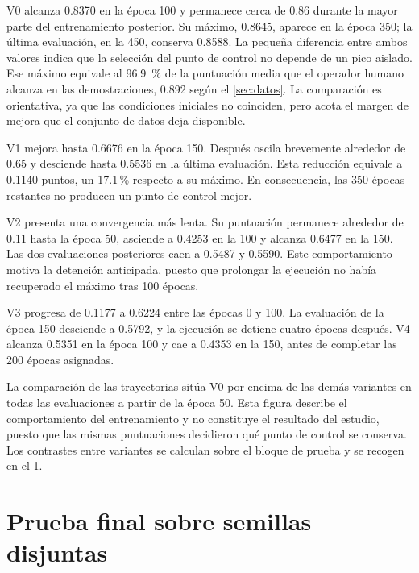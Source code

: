V0 alcanza \num{0.8370} en la \'epoca \num{100} y permanece cerca de \num{0.86} durante
la mayor parte del entrenamiento posterior. Su m\'aximo, \num{0.8645}, aparece en la
\'epoca \num{350}; la \'ultima evaluaci\'on, en la \num{450}, conserva \num{0.8588}. La
peque\~na diferencia entre ambos valores indica que la selecci\'on del punto de control no
depende de un pico aislado. Ese m\'aximo equivale al \SI{96.9}{\percent} de la puntuaci\'on
media que el operador humano alcanza en las demostraciones, \num{0.892} seg\'un el
\cref{sec:datos}. La comparaci\'on es orientativa, ya que las condiciones iniciales no
coinciden, pero acota el margen de mejora que el conjunto de datos deja disponible.

V1 mejora hasta \num{0.6676} en la \'epoca \num{150}. Despu\'es oscila brevemente alrededor
de \num{0.65} y desciende hasta \num{0.5536} en la \'ultima evaluaci\'on. Esta reducci\'on
equivale a \num{0.1140} puntos, un \num{17.1}\,\% respecto a su m\'aximo. En consecuencia,
las \num{350} \'epocas restantes no producen un punto de control mejor.

V2 presenta una convergencia m\'as lenta. Su puntuaci\'on permanece alrededor de
\num{0.11} hasta la \'epoca \num{50}, asciende a \num{0.4253} en la \num{100} y alcanza
\num{0.6477} en la \num{150}. Las dos evaluaciones posteriores caen a \num{0.5487} y
\num{0.5590}. Este comportamiento motiva la detenci\'on anticipada, puesto que prolongar
la ejecuci\'on no hab\'ia recuperado el m\'aximo tras \num{100} \'epocas.

V3 progresa de \num{0.1177} a \num{0.6224} entre las \'epocas \num{0} y \num{100}. La
evaluaci\'on de la \'epoca \num{150} desciende a \num{0.5792}, y la ejecuci\'on se detiene
cuatro \'epocas despu\'es. V4 alcanza \num{0.5351} en la \'epoca \num{100} y cae a
\num{0.4353} en la \num{150}, antes de completar las \num{200} \'epocas asignadas.

La comparaci\'on de las trayectorias sit\'ua V0 por encima de las dem\'as variantes en
todas las evaluaciones a partir de la \'epoca \num{50}. Esta figura describe el
comportamiento del entrenamiento y no constituye el resultado del estudio, puesto que las
mismas puntuaciones decidieron qu\'e punto de control se conserva. Los contrastes entre
variantes se calculan sobre el bloque de prueba y se recogen en el
\cref{sec:prueba-final}.

\section{Prueba final sobre semillas disjuntas}
\label{sec:prueba-final}


